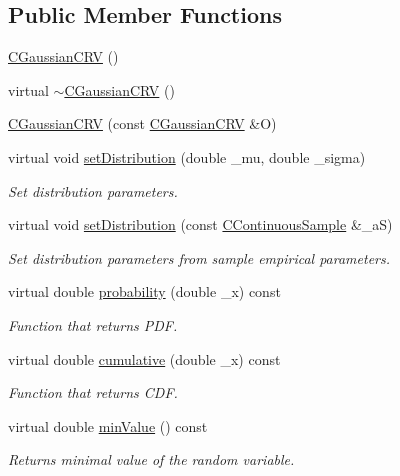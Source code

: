 \subsection*{Public Member Functions}
\begin{DoxyCompactItemize}
\item 
\hyperlink{class_c_gaussian_c_r_v_ad0467f60ab0086154121f023a37c4db2}{C\-Gaussian\-C\-R\-V} ()
\item 
virtual \hyperlink{class_c_gaussian_c_r_v_ad5bd8a3b2e6c4a811315652f0d98e9c7}{$\sim$\-C\-Gaussian\-C\-R\-V} ()
\item 
\hyperlink{class_c_gaussian_c_r_v_a888a11c81805e8fecad9887e4f75bca7}{C\-Gaussian\-C\-R\-V} (const \hyperlink{class_c_gaussian_c_r_v}{C\-Gaussian\-C\-R\-V} \&O)
\item 
virtual void \hyperlink{class_c_gaussian_c_r_v_a450fc3a79bfc1646ae43bf1ba6d23133}{set\-Distribution} (double \-\_\-mu, double \-\_\-sigma)
\begin{DoxyCompactList}\small\item\em Set distribution parameters. \end{DoxyCompactList}\item 
virtual void \hyperlink{class_c_gaussian_c_r_v_a48de04775bfdf8d0e2c5a2aa73eb500e}{set\-Distribution} (const \hyperlink{class_c_continuous_sample}{C\-Continuous\-Sample} \&\-\_\-a\-S)
\begin{DoxyCompactList}\small\item\em Set distribution parameters from sample empirical parameters. \end{DoxyCompactList}\item 
virtual double \hyperlink{class_c_gaussian_c_r_v_a14ac3654b0527aa3354d60d120abd1cb}{probability} (double \-\_\-x) const 
\begin{DoxyCompactList}\small\item\em Function that returns P\-D\-F. \end{DoxyCompactList}\item 
virtual double \hyperlink{class_c_gaussian_c_r_v_a226e37ee1c3a14d9f0dbf691267e27a1}{cumulative} (double \-\_\-x) const 
\begin{DoxyCompactList}\small\item\em Function that returns C\-D\-F. \end{DoxyCompactList}\item 
virtual double \hyperlink{class_c_gaussian_c_r_v_a89ab0f2b91ef9bb45f29bdf8f851003e}{min\-Value} () const 
\begin{DoxyCompactList}\small\item\em Returns minimal value of the random variable. \end{DoxyCompactList}\item 

\end{DoxyCompactItemize}

